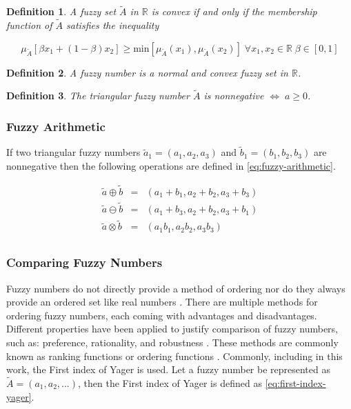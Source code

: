 \documentclass[ee,msthesis]{usuthesis}
\newtheorem{definition}{Definition}[section]
\begin{document}
\begin{definition}
A fuzzy set \(\tilde{A}\) in \(\mathbb{R}\) is convex if and only if the membership function of \(\tilde{A}\) satisfies the inequality

\begin{equation*}
\mu_{\tilde{A}}[\beta x_1 + (1-\beta)x_2] \ge \text{min}[\mu_{\tilde{A}}(x_1), \mu_{\tilde{A}}(x_2)]\; \forall x_1, x_2 \in \mathbb{R}\; \beta \in [0,1]
\end{equation*}
\end{definition}

\begin{definition}
A fuzzy number is a normal and convex fuzzy set in \(\mathbb{R}\).
\end{definition}

\begin{definition}
\label{def:triangular-nonnegative}
The triangular fuzzy number \(\tilde{A}\) is nonnegative \(\iff\; a \ge 0\).
\end{definition}

\subsubsection{Fuzzy Arithmetic}
\label{sec:orgcc118e7}
If two triangular fuzzy numbers \(\tilde{a}_1 = (a_1, a_2, a_3)\) and \(\tilde{b}_1 = (b_1, b_2, b_3)\) are nonnegative
then the following operations are defined in \ref{eq:fuzzy-arithmetic}.

\begin{equation}
\label{eq:fuzzy-arithmetic}
\begin{array}{lcl}
\tilde{a} \oplus \tilde{b} & = & (a_1 + b_1, a_2 + b_2, a_3 + b_3) \\
\tilde{a} \ominus \tilde{b} & = & (a_1 + b_3, a_2 + b_2, a_3 + b_1) \\
\tilde{a} \otimes \tilde{b} & = & (a_1 b_1, a_2 b_2, a_3 b_3)       \\
\end{array}
\end{equation}

\subsubsection{Comparing Fuzzy Numbers}
\label{sec:org1110219}
Fuzzy numbers do not directly provide a method of ordering nor do they always provide an ordered set like real numbers
\cite{bello-2019-fuzzy-activ}. There are multiple methods for ordering fuzzy numbers, each coming with advantages and
disadvantages. Different properties have been applied to justify comparison of fuzzy numbers, such as: preference,
rationality, and robustness \cite{jimenez-2007-linear-progr,bello-2019-fuzzy-activ,kaur-2016-introd-fuzzy}. These
methods are commonly known as ranking functions or ordering functions
\cite{bello-2019-fuzzy-activ,das-2016-mathem-model,kaur-2016-introd-fuzzy}. Commonly, including in this work, the
First index of Yager \cite{yager-1981-proced-order} is used. Let a fuzzy number be represented as \(\tilde{A} =
(a_1,a_2,...)\), then the First index of Yager is defined as \ref{eq:first-index-yager}.
\end{document}
